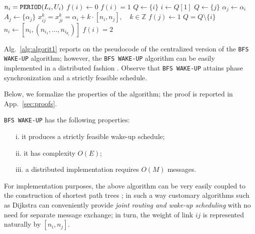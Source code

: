 \begin{algorithm}[t]
\caption{\tt BFS WAKE-UP}
\label{alg:algorit1}
\begin{algorithmic}[1]
 
\STATE $n_i=\mbox{{\tt PERIOD}}(L_i,U_i)$
\STATE $f(i) \leftarrow 0$  \ENDFOR
{}
\STATE $f(i)=1$  
\STATE $Q\leftarrow \{i\}$      
\STATE $i\leftarrow Q[1]$ 
\STATE $Q \leftarrow \{j\}$  
\STATE $\alpha_j\leftarrow \alpha_i$    
\STATE $A_j\leftarrow \{\alpha_j\}$    
\STATE $x_{ij}^k=x_{ji}^k=\alpha_i+k\cdot [n_i,n_j],\quad k\in \mathbb Z$ 
\STATE $f(j)\leftarrow 1$           
\ENDIF
\ENDFOR
\STATE    $Q = Q \setminus \{i\}$  
\STATE    $n_i\leftarrow [n_{i},(n_{i_1},\ldots,n_{i_{d_i}})]$ 
\STATE    $f(i)=2$              
\ENDWHILE 
\end{algorithmic}
\end{algorithm}



Alg.~\ref{alg:algorit1} reports on the pseudocode of the centralized version of the {\tt BFS WAKE-UP} algorithm;  
however, the {\tt BFS WAKE-UP} algorithm can be easily implemented in a distributed fashion \cite{Cormen}. Observe that {\tt BFS WAKE-UP} 
attains phase synchronization and a strictly feasible schedule. 

 Below, we formalize the properties of the algorithm; the proof is reported in App.~\ref{sec:proofs}.
\begin{thm}\label{thm:BFS}
{\tt BFS WAKE-UP} has the following properties:
\begin{enumerate}
\item[  i.] it produces a strictly feasible wake-up schedule; 
\item[ ii.] it has complexity $O(E)$; 
\item[iii.] a distributed implementation requires $O(M)$ messages.
\end{enumerate}
\end{thm}


\begin{rem}
 For implementation purposes, the above algorithm can be very easily coupled to the construction 
of shortest path trees \cite{Cormen}; in such a way customary algorithms such as Dijkstra 
can conveniently provide {\em joint routing and wake-up scheduling} with no need for 
separate message exchange; in turn, the weight of link $ij$ is represented naturally by $[n_i,n_j]$.
\end{rem}

